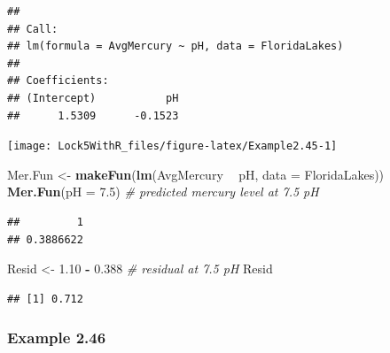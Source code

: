 \documentclass[]{book}
\newenvironment{Shaded}{\begin{snugshade}}{\end{snugshade}}
\newcommand{\CommentTok}[1]{\textcolor[rgb]{0.56,0.35,0.01}{\textit{#1}}}
\newcommand{\DataTypeTok}[1]{\textcolor[rgb]{0.13,0.29,0.53}{#1}}
\newcommand{\FloatTok}[1]{\textcolor[rgb]{0.00,0.00,0.81}{#1}}
\newcommand{\KeywordTok}[1]{\textcolor[rgb]{0.13,0.29,0.53}{\textbf{#1}}}
\newcommand{\NormalTok}[1]{#1}
\newcommand{\OperatorTok}[1]{\textcolor[rgb]{0.81,0.36,0.00}{\textbf{#1}}}
\newcommand{\StringTok}[1]{\textcolor[rgb]{0.31,0.60,0.02}{#1}}
\begin{document}
\begin{verbatim}
## 
## Call:
## lm(formula = AvgMercury ~ pH, data = FloridaLakes)
## 
## Coefficients:
## (Intercept)           pH  
##      1.5309      -0.1523
\end{verbatim}

\begin{Shaded}
\end{Shaded}

\texttt{[image: Lock5WithR\_files/figure-latex/Example2.45-1]}

\begin{Shaded}
\begin{Highlighting}[]
\NormalTok{Mer.Fun <-}\StringTok{ }\KeywordTok{makeFun}\NormalTok{(}\KeywordTok{lm}\NormalTok{(AvgMercury }\OperatorTok{~}\StringTok{ }\NormalTok{pH, }\DataTypeTok{data =}\NormalTok{ FloridaLakes))}
\KeywordTok{Mer.Fun}\NormalTok{(}\DataTypeTok{pH =} \FloatTok{7.5}\NormalTok{) }\CommentTok{# predicted mercury level at 7.5 pH}
\end{Highlighting}
\end{Shaded}

\begin{verbatim}
##         1 
## 0.3886622
\end{verbatim}

\begin{Shaded}
\begin{Highlighting}[]
\NormalTok{Resid <-}\StringTok{ }\FloatTok{1.10} \OperatorTok{-}\StringTok{ }\FloatTok{0.388} \CommentTok{# residual at 7.5 pH}
\NormalTok{Resid}
\end{Highlighting}
\end{Shaded}

\begin{verbatim}
## [1] 0.712
\end{verbatim}

\hypertarget{example-2.46}{%
\subsubsection{Example 2.46}\label{example-2.46}}
\end{document}
